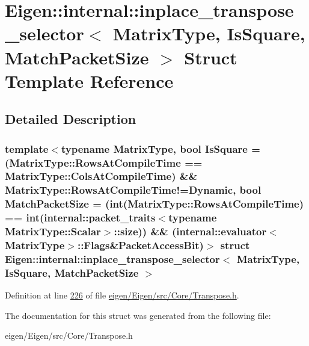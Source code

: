\hypertarget{struct_eigen_1_1internal_1_1inplace__transpose__selector}{}\section{Eigen\+:\+:internal\+:\+:inplace\+\_\+transpose\+\_\+selector$<$ Matrix\+Type, Is\+Square, Match\+Packet\+Size $>$ Struct Template Reference}
\label{struct_eigen_1_1internal_1_1inplace__transpose__selector}


\subsection{Detailed Description}
\subsubsection*{template$<$typename Matrix\+Type, bool Is\+Square = (\+Matrix\+Type\+::\+Rows\+At\+Compile\+Time == Matrix\+Type\+::\+Cols\+At\+Compile\+Time) \&\& Matrix\+Type\+::\+Rows\+At\+Compile\+Time!=\+Dynamic, bool Match\+Packet\+Size = (int(\+Matrix\+Type\+::\+Rows\+At\+Compile\+Time) == int(internal\+::packet\+\_\+traits$<$typename Matrix\+Type\+::\+Scalar$>$\+::size)) \&\& (internal\+::evaluator$<$\+Matrix\+Type$>$\+::\+Flags\&\+Packet\+Access\+Bit)$>$\newline
struct Eigen\+::internal\+::inplace\+\_\+transpose\+\_\+selector$<$ Matrix\+Type, Is\+Square, Match\+Packet\+Size $>$}



Definition at line \hyperlink{eigen_2_eigen_2src_2_core_2_transpose_8h_source_l00226}{226} of file \hyperlink{eigen_2_eigen_2src_2_core_2_transpose_8h_source}{eigen/\+Eigen/src/\+Core/\+Transpose.\+h}.



The documentation for this struct was generated from the following file\+:\begin{DoxyCompactItemize}
\item 
eigen/\+Eigen/src/\+Core/\+Transpose.\+h\end{DoxyCompactItemize}
